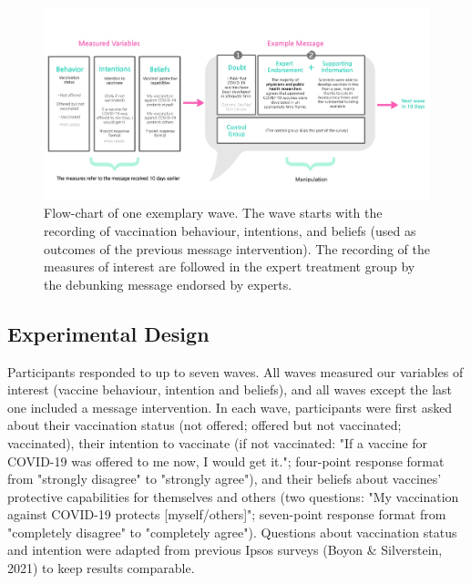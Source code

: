 \documentclass[authordate, empirical]{jote-new-article}
\begin{document}
\begin{figure}[bh!]
  \begin{fullwidth}
    \includegraphics[width=\linewidth]{media/image1.jpg}

    \caption{Flow-chart of one exemplary wave. The wave starts with the recording of vaccination behaviour, intentions, and beliefs (used as outcomes of the previous message intervention). The recording of the measures of interest are followed in the expert treatment group by the debunking message endorsed by experts.}

    \label{fig:rId9}

  \end{fullwidth}
\end{figure}




\subsection{Experimental Design}

Participants responded to up to seven waves. All waves measured our variables of interest (vaccine behaviour, intention and beliefs), and all waves except the last one included a message intervention. In each wave, participants were first asked about their vaccination status (not offered; offered but not vaccinated; vaccinated), their intention to vaccinate (if not vaccinated: "If a vaccine for COVID-19 was offered to me now, I would get it."; four-point response format from "strongly disagree" to "strongly agree"), and their beliefs about vaccines' protective capabilities for themselves and others (two questions: "My vaccination against COVID-19 protects [myself/others]"; seven-point response format from "completely disagree" to "completely agree"). Questions about vaccination status and intention were adapted from previous Ipsos surveys (Boyon \& Silverstein, 2021) to keep results comparable.
\end{document}
